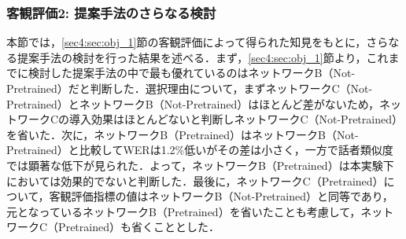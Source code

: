 \documentclass[12pt]{jarticle}
\numberwithin{equation}{section}    %
\numberwithin{figure}{section}      %
\numberwithin{table}{section}      %
\begin{document}
\subsubsection{客観評価2: 提案手法のさらなる検討}
\label{sec4:sec:obj_2}
本節では，\ref{sec4:sec:obj_1}節の客観評価によって得られた知見をもとに，さらなる提案手法の検討を行った結果を述べる．まず，\ref{sec4:sec:obj_1}節より，これまでに検討した提案手法の中で最も優れているのはネットワークB（Not-Pretrained）だと判断した．選択理由について，まずネットワークC（Not-Pretrained）とネットワークB（Not-Pretrained）はほとんど差がないため，ネットワークCの導入効果はほとんどないと判断しネットワークC（Not-Pretrained）を省いた．次に，ネットワークB（Pretrained）はネットワークB（Not-Pretrained）と比較してWERは1.2\%低いがその差は小さく，一方で話者類似度では顕著な低下が見られた．よって，ネットワークB（Pretrained）は本実験下においては効果的でないと判断した．最後に，ネットワークC（Pretrained）について，客観評価指標の値はネットワークB（Not-Pretrained）と同等であり，元となっているネットワークB（Pretrained）を省いたことも考慮して，ネットワークC（Pretrained）も省くこととした．
\end{document}

